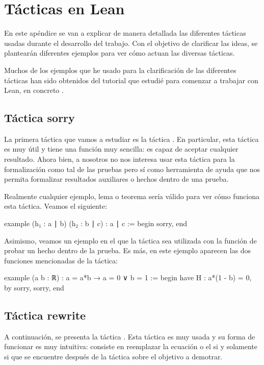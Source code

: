\chapter{Tácticas en Lean}\label{apentacti}

En este apéndice se van a explicar de manera detallada las diferentes
tácticas usadas durante el desarrollo del trabajo. Con el objetivo de
clarificar las ideas, se plantearán diferentes ejemplos para ver cómo
actuan las diversas tácticas.

Muchos de los ejemplos que he usado para la clarificación de las
diferentes tácticas han sido obtenidos del tutorial que estudié para
comenzar a trabajar con Lean, en concreto \cite{tutor}.

\section{Táctica sorry}

La primera táctica que vamos a estudiar es la táctica
.  En particular, esta táctica es muy útil y tiene
una función muy sencilla: es capaz de aceptar cualquier resultado. Ahora
bien, a nosotros no nos interesa usar esta táctica para la formalización
como tal de las pruebas pero sí como herramienta de ayuda que nos
permita formalizar resultados auxiliares o hechos dentro de una prueba.

Realmente cualquier ejemplo, lema o teorema sería válido para ver cómo
funciona esta táctica. Veamos el siguiente:
\begin{leancode}
example (h₁ : a ∣ b) (h₂ : b ∣ c) : a ∣ c :=
begin
  sorry,
end
\end{leancode}

Asimismo, veamos un ejemplo en el que la táctica  sea
utilizada con la función de probar un hecho dentro de la prueba. Es más,
en este ejemplo aparecen las dos funciones mencionadas de la táctica:
\begin{leancode}
example (a b : ℝ) : a = a*b → a = 0 ∨ b = 1 :=
begin
  have H : a*(1 - b) = 0, by sorry,
  sorry,
end
\end{leancode}

\section{Táctica rewrite}

A continuación, se presenta la táctica . Esta táctica
es muy usada y su forma de funcionar es muy intuitiva: consiste en reemplazar
la ecuación o el si y solamente si que se encuentre después de la táctica
 sobre el objetivo a demotrar.

